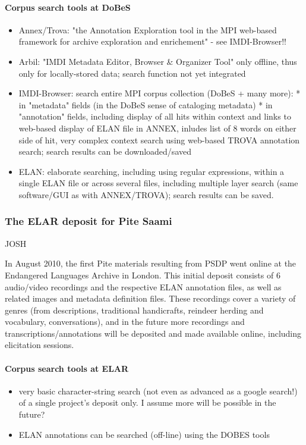 \documentclass[a4paper,12pt]{article}
\begin{document}
\paragraph{Corpus search tools at DoBeS}
\begin{itemize}
\item Annex/Trova: "the Annotation Exploration tool in the MPI web-based framework for archive exploration and enrichement" - see IMDI-Browser!!
\item Arbil: "IMDI Metadata Editor, Browser \& Organizer Tool" only offline, thus only for locally-stored data; search function not yet integrated
\item IMDI-Browser: search entire MPI corpus collection (DoBeS + many more):
	* in "metadata" fields (in the DoBeS sense of cataloging metadata)
	* in "annotation" fields, including display of all hits within context and links to web-based display of ELAN file in ANNEX, inludes list of 8 words on either side of hit, very complex context search using web-based TROVA annotation search; search results can be downloaded/saved
\item ELAN: elaborate searching, including using regular expressions, within a single ELAN file or across several files, including multiple layer search (same software/GUI as with ANNEX/TROVA); search results can be saved.	
\end{itemize}


\subsubsection{The ELAR deposit for Pite Saami}
JOSH

In August 2010, the first Pite materials resulting from PSDP went online at the Endangered Languages Archive in London. This initial deposit consists of 6 audio/video recordings and the respective ELAN annotation files, as well as related images and metadata definition files. These recordings cover a variety of genres (from descriptions, traditional handicrafts, reindeer herding and vocabulary, conversations), and in the future more recordings and transcriptions/annotations will be deposited and made available online, including elicitation sessions.

\paragraph{Corpus search tools at ELAR} 
\begin{itemize}
\item very basic character-string search (not even as advanced as a google search!) of a single project's deposit only. I assume more will be possible in the future?
\item ELAN annotations can be searched (off-line) using the DOBES tools
\end{itemize}
\end{document}
